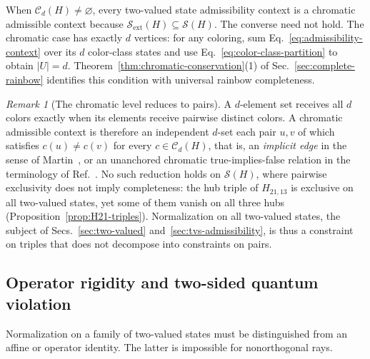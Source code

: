 \documentclass[aps,pra,reprint,superscriptaddress,longbibliography,nofootinbib,floatfix,10pt]{revtex4-2}
\theoremstyle{definition}\newtheorem{definition}[theorem]{Definition}
\theoremstyle{remark}\newtheorem{remark}[theorem]{Remark}
\newcommand{\Sc}{\mathcal S}\newcommand{\Cc}{\mathcal C}\newcommand{\Wc}{\mathcal W}
\begin{document}
When $\Cc_d(H)\neq\varnothing$, every two-valued state admissibility context is a chromatic admissible context because $\Sc_{\mathrm{ext}}(H)\subseteq\Sc(H)$. The converse need not hold. The chromatic case has exactly $d$ vertices: for any coloring, sum Eq.~\eqref{eq:admissibility-context} over its $d$ color-class states and use Eq.~\eqref{eq:color-class-partition} to obtain $|U|=d$. Theorem~\ref{thm:chromatic-conservation}(1) of Sec.~\ref{sec:complete-rainbow} identifies this condition with universal rainbow completeness.

\begin{remark}[The chromatic level reduces to pairs]\label{rem:implicit-edges}
A $d$-element set receives all $d$ colors exactly when its elements receive pairwise distinct colors. A chromatic admissible context is therefore an independent $d$-set each pair $u,v$ of which satisfies $c(u)\neq c(v)$ for every $c\in\Cc_d(H)$, that is, an \emph{implicit edge} in the sense of Martin~\cite{martin2009}, or an unanchored chromatic true-implies-false relation in the terminology of Ref.~\cite{svozil-2026-chromaticcoordinatization}. No such reduction holds on $\Sc(H)$, where pairwise exclusivity does not imply completeness: the hub triple of $H_{21,13}$ is exclusive on all two-valued states, yet some of them vanish on all three hubs (Proposition~\ref{prop:H21-triples}). Normalization on all two-valued states, the subject of Secs.~\ref{sec:two-valued} and~\ref{sec:tvs-admissibility}, is thus a constraint on triples that does not decompose into constraints on pairs.
\end{remark}

\subsection{Operator rigidity and two-sided quantum violation}\label{sec:no-go-operator}
Normalization on a family of two-valued states must be distinguished from an affine or operator identity. The latter is impossible for nonorthogonal rays.
\end{document}
